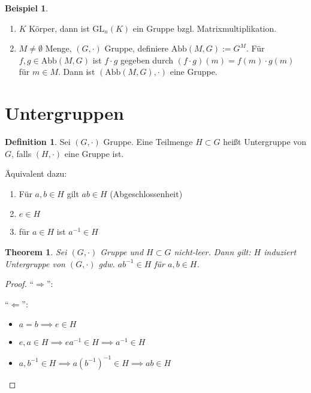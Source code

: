 \documentclass[fleqn, 12pt]{scrartcl}
\newtheorem{thm}{Theorem}
\theoremstyle{definition}
\newtheorem*{defn}{Definition}
\newtheorem{ex}{Beispiel}
\theoremstyle{remark}
\newcommand{\gl}{\text{GL}}
\newcommand{\abb}{\text{Abb}}
\newcommand{\inv}[1]{\left(#1\right)^{-1}}
\newcommand{\Inv}[1]{#1^{-1}}
\begin{document}
\begin{ex}
    \begin{enumerate}
        \item \(K\) Körper, dann ist \(\gl_n(K)\) ein Gruppe bzgl. Matrixmultiplikation.
        \item \(M\neq \emptyset\) Menge, \((G, \cdot)\) Gruppe, definiere \(\abb(M,G):=G^M\). Für \(f,g\in \abb(M,G)\) ist \(f\cdot g\) gegeben durch \((f\cdot g)(m)=f(m)\cdot g(m)\) für \(m\in M\). Dann ist \((\abb(M,G), \cdot)\) eine Gruppe.
    \end{enumerate}
\end{ex}

\section{Untergruppen}

\begin{defn}
    Sei \((G, \cdot)\) Gruppe. Eine Teilmenge \(H\subset G\) heißt Untergruppe von \(G\), falls \((H, \cdot)\) eine Gruppe ist.

    Äquivalent dazu:

    \begin{enumerate}
        \item Für \(a,b\in H\) gilt \(ab\in H\) (Abgeschlossenheit)
        \item \(e\in H\)
        \item für \(a\in H\) ist \(\Inv a \in H\)
    \end{enumerate}
\end{defn}

\begin{thm}
    Sei \((G, \cdot)\) Gruppe und \(H\subset G\) nicht-leer. Dann gilt: \(H\) induziert Untergruppe von \((G, \cdot)\) gdw. \(a\Inv b\in H\) für \(a,b\in H\).
\end{thm}

\begin{proof}
    “\(\Rightarrow\)”: \checkmark

    “\(\Leftarrow\)”:
    \begin{itemize} 
        \item \(a=b \implies e\in H\)
        \item \(e,a\in H \implies e\Inv a\in H \implies \Inv a \in H\)
        \item \(a,\Inv b\in H \implies a\inv{\Inv b} \in H \implies ab\in H\)
    \end{itemize}
\end{proof}
\end{document}
